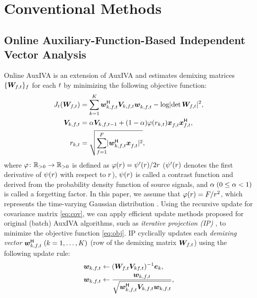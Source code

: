 \documentclass[sip,biber]{now-journal}
\begin{document}
\section{Conventional Methods}\label{sec:conventional}

\subsection{Online Auxiliary-Function-Based Independent Vector Analysis}\label{subsec:oiva}

Online AuxIVA \cite{Taniguchi:2014:HSCMA} is an extension of AuxIVA \cite{Ono:2011:WASPAA} and estimates demixing matrices $\{\Demix _{\ft}\} _{\freq}$ for each $t$ by minimizing the following objective function:
\begin{align}
  J _{\tframe}(\Demix _{\ft}) &= \sum _{\src = 1} ^{\Src} \demix _{\src,\ft} ^{\hermite} \cov _{\src,\ft} \demix _{\src,\ft} ^{\nohermite} - \logdet{\Demix _{\ft}} ^2, \label{eq:obj} \\
  \cov _{\src,\ft} &= \forget \cov _{\src,\ft[-1]} + (1 - \forget) \weight(\var _{\src,\tframe}) \Obs _{\ft} ^{\nohermite} \Obs _{\ft} ^{\hermite}, \label{eq:cov} \\
  \var _{\src,\tframe} &= \sqrt{\sum _{\freq=1} ^{\Freq} \lvert \demix ^{\hermite} _{\src,\ft} \Obs ^{\nohermite}_{\ft} \rvert ^2},
\end{align}
where $\varphi\colon \mathbb{R} _{>0} \to \mathbb{R} _{>0}$ is defined as $\varphi(r) = \psi ' (r) / 2 r$ ($\psi '(r)$ denotes the first derivative of $\psi (r)$ with respect to $r$),
$\psi(r)$ is called a contrast function and derived from the probability density function of source signals,
and $\alpha\; (0 \leq \alpha < 1)$ is called a forgetting factor.
In this paper, we assume that $\varphi (r) = F/{r ^2}$, which represents the time-varying Gaussian distribution \cite{Ono:2012:APSIPA}.
Using the recursive update for covariance matrix \eqref{eq:cov}, we can apply efficient update methods proposed for original (batch) AuxIVA algorithms, such as \emph{iterative projection (IP)} \cite{Ono:2011:WASPAA}, to minimize the objective function \eqref{eq:obj}.
IP cyclically updates each \emph{demixing vector} $\demix _{\src,\ft} ^{\hermite}\; (\src = 1, \dots, \Src)$ (row of the demixing matrix $\Demix _{\ft}$) using the following update rule:
\begin{align}
  \demix _{\src,\ft} &\gets (\Demix _{\ft} \cov _{\src\ft}) ^{-1} \eye _{\src} \label{eq:ip:proj}, \\
  \demix _{\src,\ft} &\gets \frac{{\demix _{\src,\ft}}}{{\sqrt{\demix _{\src,\ft} ^{\hermite} \cov _{\src,\ft} \demix _{\src,\ft}}}} \label{eq:ip:norm},
\end{align}
\end{document}
